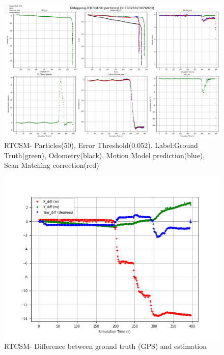     \begin{figure}[h] 
        \includegraphics[height=0.6\textwidth]{images/GMapping-RTCSM-50 particles(19.23076923076923)_PositionParameters.png}
        \caption{RTCSM- Particles(50), Error Threshold(0.052). Label:Ground Truth(green), Odometry(black), Motion Model prediction(blue), Scan Matching correction(red)}
        \label{fig:RTCSM_50_0.052}
    \end{figure}
    \begin{figure}[h] 
        \includegraphics[height=0.4\textwidth]{images/GMapping-RTCSM-50 particles(19.23076923076923)_True_vs_Crct.png}
        \caption{RTCSM- Difference between ground truth (GPS) and estimation}
        \label{fig:RTCSM_50_0.052_diff}
    \end{figure}
\clearpage

